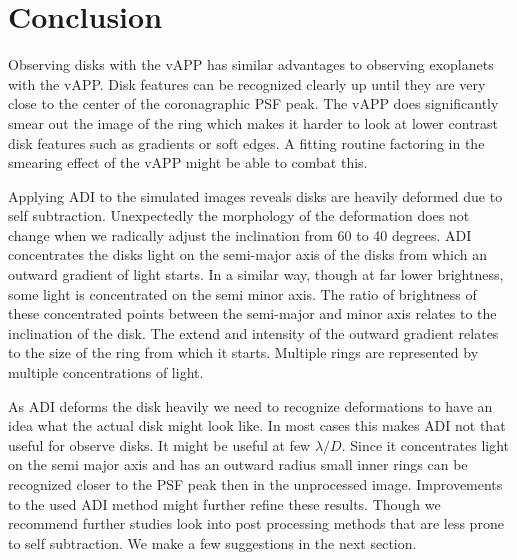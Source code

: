 
%

\section{Conclusion}

Observing disks with the \ac{vAPP} has similar advantages to observing exoplanets with the \ac{vAPP}. Disk features can be recognized clearly up until they are very close to the center of the coronagraphic \ac{PSF} peak. The \ac{vAPP} does significantly smear out the image of the ring which makes it harder to look at lower contrast disk features such as gradients or soft edges. A fitting routine factoring in the smearing effect of the \ac{vAPP} might be able to combat this.

Applying \ac{ADI} to the simulated images reveals disks are heavily deformed due to self subtraction. Unexpectedly the morphology of the deformation does not change when we radically adjust the inclination from 60 to 40 degrees. \ac{ADI} concentrates the disks light on the semi-major axis of the disks from which an outward gradient of light starts. In a similar way, though at far lower brightness, some light is concentrated on the semi minor axis. The ratio of brightness of these concentrated points between the semi-major and minor axis relates to the inclination of the disk. The extend and intensity of the outward gradient relates to the size of the ring from which it starts. Multiple rings are represented by multiple concentrations of light.

As \ac{ADI} deforms the disk heavily we need to recognize deformations to have an idea what the actual disk might look like. In most cases this makes \ac{ADI} not that useful for observe disks. It might be useful at few $\lambda/D$. Since it concentrates light on the semi major axis and has an outward radius small inner rings can be recognized closer to the \ac{PSF} peak then in the unprocessed image. Improvements to the used \ac{ADI} method might further refine these results. Though we recommend further studies look into post processing methods that are less prone to self subtraction. We make a few suggestions in the next section.
